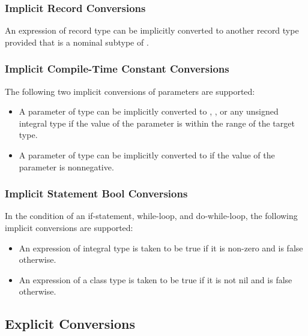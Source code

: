 \subsubsection{Implicit Record Conversions}
\label{Implicit_Record_Conversions}

An expression of record type  can be implicitly converted to
another record type  provided that  is a nominal
subtype of .

\subsubsection{Implicit Compile-Time Constant Conversions}
\label{Implicit_Compile_Time_Constant_Conversions}

The following two implicit conversions of parameters are supported:
\begin{itemize}
\item A parameter of type  can be implicitly converted
to , , or any unsigned integral type if the
value of the parameter is within the range of the target type.
\item A parameter of type  can be implicitly converted
to  if the value of the parameter is nonnegative.
\end{itemize}

\subsubsection{Implicit Statement Bool Conversions}
\label{Implicit_Statement_Bool_Conversions}

In the condition of an if-statement, while-loop, and do-while-loop,
the following implicit conversions are supported:
\begin{itemize}
\item An expression of integral type is taken to be true if it is non-zero and is false otherwise.
\item An expression of a class type is taken to be true if it is not nil and is false otherwise.
\end{itemize}

\subsection{Explicit Conversions}
\label{Explicit_Conversions}

